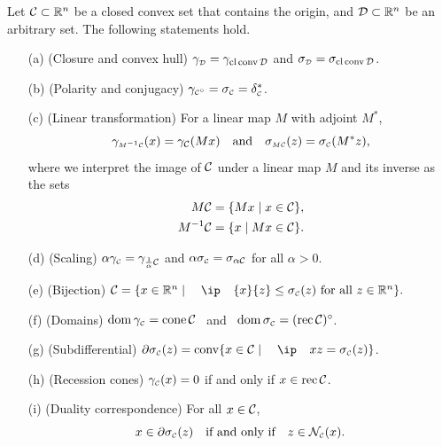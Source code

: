 \begin{proposition} \label{prop-support-properties} Let $\mathcal{C}\subset\mathbb{R}^n$ be a
  closed convex set that contains the origin, and $\mathcal{D}\subset\mathbb{R}^n$ be an
  arbitrary set. The following statements hold.
  \begin{itemize}
    \item[(a)] (Closure and convex hull) 
    $\gamma_{\scriptscriptstyle\mathcal{D}} =
    \gamma_{\operatorname{cl}\operatorname{conv}\mathcal{D}}$ and $\sigma_{\scriptscriptstyle\mathcal{D}} =
    \sigma_{\operatorname{cl}\operatorname{conv}\mathcal{D}}$.
    \item[(b)] (Polarity and conjugacy) \label{prop-support-properties-polarity}
      $\gamma_{\scriptscriptstyle\mathcal{C}^\circ} = \sigma_{\scriptscriptstyle\mathcal{C}} = \delta^*_{\scriptscriptstyle\mathcal{C}}$.
    \item[(c)] (Linear transformation) \label{prop-linear-transform} For a
      linear map $M$ with adjoint $M^*$,
      \[
        \gamma_{\scriptscriptstyle M^{-1}\mathcal{C}}(x) = \gamma_{\mathcal{C}}(Mx)
          \hbox{\quad and\quad}
        \sigma_{\scriptscriptstyle M\mathcal{C}}(z) = \sigma_{\scriptscriptstyle\mathcal{C}}(M^* z),
      \]
      where we interpret the image of $\mathcal{C}$ under a linear map $M$ and its
      inverse as the sets
      \begin{align*}
        M\mathcal{C}     &=\{M x \mid x\in\mathcal{C}\},
    \\  M^{-1}\mathcal{C} &= \{x \mid Mx\in\mathcal{C}\}.
      \end{align*}
    \item[(d)] (Scaling) \label{prop-scaling}
      $\alpha\gamma_{\scriptscriptstyle\mathcal{C}}=\gamma_{\frac1\alpha\mathcal{C}}$ and
      $\alpha\sigma_{\scriptscriptstyle\mathcal{C}}=\sigma_{\alpha\mathcal{C}}$ for all $\alpha>0$.
    \item[(e)] (Bijection) \label{prop-support-properties-bijection}
    $\Cscr = \{x\in\Re^n \mid \ip{x}{z} \leq \sigma\Cs(z) \mbox{\ for all\ } z \in\Re^n\}.$
    \item[(f)] (Domains) \label{prop-support-properties-domain}
      $\operatorname{dom}\gamma_{\scriptscriptstyle\mathcal{C}} = \operatorname{cone}\mathcal{C}$ \ and \
      $\operatorname{dom}\sigma_{\scriptscriptstyle\mathcal{C}}=(\operatorname{rec}\mathcal{C})^\circ$.
    \item[(g)] (Subdifferential) \label{prop-support-properties-subdiff}
      $\partial\sigma\Cs(z)
       =\conv\{x\in\Cscr \mid \ip x z = \sigma\Cs(z)\}
       $.
    \item[(h)] (Recession cones) \label{prop-support-properties-recession}
      $\gamma_{\scriptscriptstyle\mathcal{C}}(x)=0$ if and only if $x\in\operatorname{rec}\mathcal{C}$.
    \item[(i)] (Duality correspondence) \label{prop-support-properties-correspondence}
    For all $x \in \mathcal{C}$,
    \[
       x \in \partial\sigma_{\scriptscriptstyle\mathcal{C}}(z)
       \hbox{\quad if and only if\quad}
       z \in \mathcal{N}_{\scriptscriptstyle\mathcal{C}}(x).
    \]
    \end{itemize}
\end{proposition}

